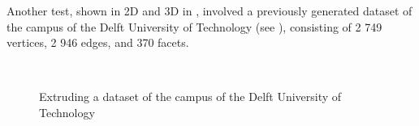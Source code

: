 Another test, shown in 2D and 3D in , involved a previously generated dataset of the campus of the Delft University of Technology (see \citet{Ledoux11a}), consisting of 2 749 vertices, 2 946 edges, and 370 facets.
\begin{figure}[tb]
\centering
{}
{}
\\
\caption{Extruding a dataset of the campus of the Delft University of Technology}
\label{fig:campus}
\end{figure}
